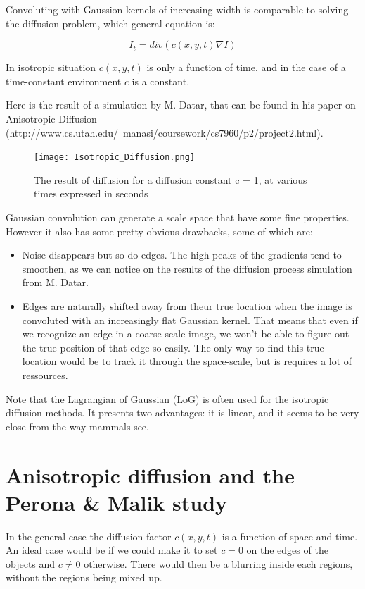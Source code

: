 \documentclass[12pt,a4paper]{book}
\begin{document}
Convoluting with Gaussion kernels of increasing width is comparable to solving the diffusion problem, which general equation is:

\begin{equation}
I_{t} = div(c(x,y,t) \nabla I)
\end{equation}

In isotropic situation $c(x,y,t)$ is only a function of time, and in the case of a time-constant environment $c$ is a constant.

Here is the result of a simulation by M. Datar, that can be found in his paper on Anisotropic Diffusion (http://www.cs.utah.edu/~manasi/coursework/cs7960/p2/project2.html).
\begin{figure}
	\caption{The result of diffusion for a diffusion constant c = 1, at various times expressed in seconds}
	\texttt{[image: Isotropic\_Diffusion.png]}
\end{figure}

Gaussian convolution can generate a scale space that have some fine properties. However it also has some pretty obvious drawbacks, some of which are:
\begin{itemize}
	\item Noise disappears but so do edges. The high peaks of the gradients tend to smoothen, as we can notice on the results of the diffusion process simulation from M. Datar.
	\item Edges are naturally shifted away from theur true location when the image is convoluted with an increasingly flat Gaussian kernel. That means that even if we recognize an edge in a coarse scale image, we won't be able to figure out the true position of that edge so easily. The only way to find this true location would be to track it through the space-scale, but is requires a lot of ressources.
\end{itemize}

Note that the Lagrangian of Gaussian (LoG) is often used for the isotropic diffusion methods. It presents two advantages: it is linear, and it seems to be very close from the way mammals see.

\section{Anisotropic diffusion and the Perona \& Malik study}

In the general case the diffusion factor $c(x,y,t)$ is a function of space and time.
An ideal case would be if we could make it to set $c=0$ on the edges of the objects and $c \neq 0$ otherwise. There would then be a blurring inside each regions, without the regions being mixed up.
\end{document}
